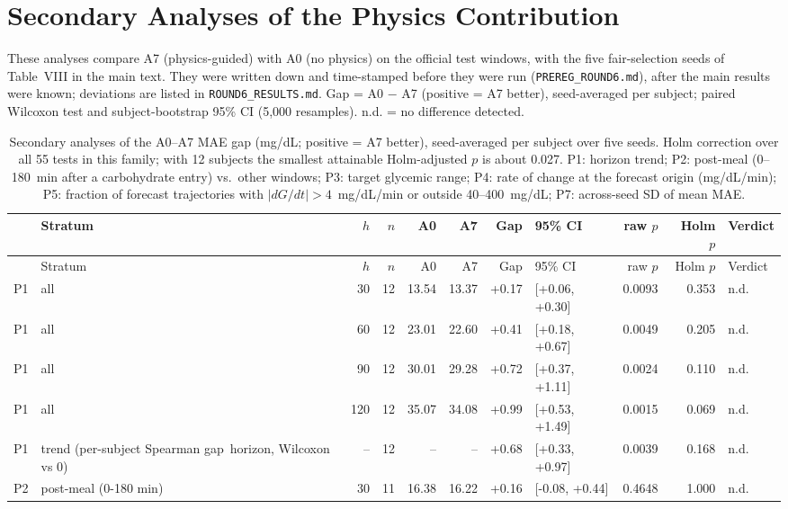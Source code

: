\documentclass[10pt]{article}
\begin{document}
\clearpage
\section*{Secondary Analyses of the Physics Contribution}
These analyses compare A7 (physics-guided) with A0 (no physics) on the official test windows, with the five fair-selection seeds of Table~VIII in the main text. They were written down and time-stamped before they were run (\texttt{PREREG\_ROUND6.md}), after the main results were known; deviations are listed in \texttt{ROUND6\_RESULTS.md}. Gap = A0 $-$ A7 (positive = A7 better), seed-averaged per subject; paired Wilcoxon test and subject-bootstrap 95\% CI (5,000 resamples). n.d. = no difference detected.

{\scriptsize
\setlength{\tabcolsep}{3pt}
\begin{longtable}{l>{\raggedright\arraybackslash}p{3.6cm}rrrrrlrrl}
\caption{Secondary analyses of the A0--A7 MAE gap (mg/dL; positive = A7 better), seed-averaged per subject over five seeds. Holm correction over all 55 tests in this family; with 12 subjects the smallest attainable Holm-adjusted $p$ is about 0.027. P1: horizon trend; P2: post-meal (0--180~min after a carbohydrate entry) vs.\ other windows; P3: target glycemic range; P4: rate of change at the forecast origin (mg/dL/min); P5: fraction of forecast trajectories with $|dG/dt| > 4$~mg/dL/min or outside 40--400~mg/dL; P7: across-seed SD of mean MAE.}\label{tab:secondary}\\
\toprule
 & Stratum & $h$ & $n$ & A0 & A7 & Gap & 95\% CI & raw $p$ & Holm $p$ & Verdict \\
\midrule
\endfirsthead
\toprule
 & Stratum & $h$ & $n$ & A0 & A7 & Gap & 95\% CI & raw $p$ & Holm $p$ & Verdict \\
\midrule
\endhead
P1 & all & 30 & 12 & 13.54 & 13.37 & +0.17 & [+0.06, +0.30] & 0.0093 & 0.353 & n.d. \\
P1 & all & 60 & 12 & 23.01 & 22.60 & +0.41 & [+0.18, +0.67] & 0.0049 & 0.205 & n.d. \\
P1 & all & 90 & 12 & 30.01 & 29.28 & +0.72 & [+0.37, +1.11] & 0.0024 & 0.110 & n.d. \\
P1 & all & 120 & 12 & 35.07 & 34.08 & +0.99 & [+0.53, +1.49] & 0.0015 & 0.069 & n.d. \\
P1 & trend (per-subject Spearman gap~horizon, Wilcoxon vs 0) & -- & 12 & -- & -- & +0.68 & [+0.33, +0.97] & 0.0039 & 0.168 & n.d. \\
P2 & post-meal (0-180 min) & 30 & 11 & 16.38 & 16.22 & +0.16 & [-0.08, +0.44] & 0.4648 & 1.000 & n.d. \\

\end{longtable}}
\end{document}
